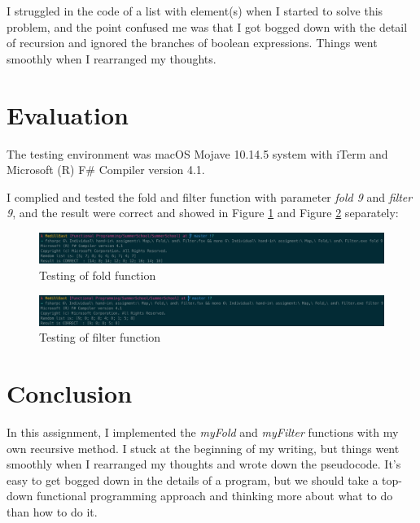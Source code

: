 \documentclass{article}
\begin{document}
I struggled in the code of a list with element(s) when I started to solve this problem, and the point confused me was that I got bogged down with the detail of recursion and ignored the branches of boolean expressions. Things went smoothly when I rearranged my thoughts.

\section{Evaluation}

The testing environment was macOS Mojave 10.14.5 system with iTerm and Microsoft (R) F\# Compiler version 4.1.

I complied and tested the fold and filter function with parameter \emph{fold 9} and \emph{filter 9}, and the result were correct and showed in Figure \ref{fig:fold} and Figure \ref{fig:filter} separately:

\begin{figure}[h]
      \centering
      \includegraphics[width=\linewidth]{fold2}
      \caption{Testing of fold function}
      \label{fig:fold}
\end{figure}

\begin{figure}[h]
      \centering
      \includegraphics[width=\linewidth]{filter2}
      \caption{Testing of filter function}
      \label{fig:filter}
\end{figure}

\section{Conclusion}

In this assignment, I implemented the \emph{myFold} and \emph{myFilter} functions with my own recursive method. I stuck at the beginning of my writing, but things went smoothly when I rearranged my thoughts and wrote down the pseudocode. It's easy to get bogged down in the details of a program, but we should take a top-down functional programming approach and thinking more about what to do than how to do it.




\end{document}
